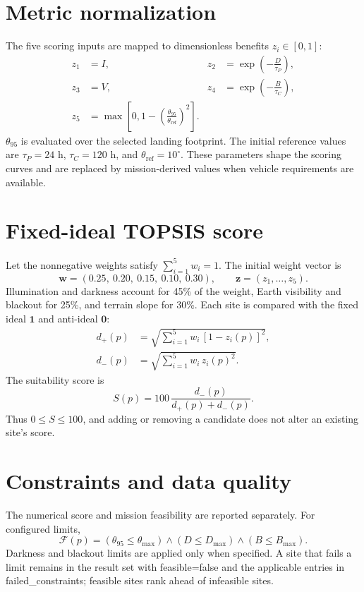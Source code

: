 \documentclass[10pt,a4paper]{article}
\newcommand{\code}[1]{{\ttfamily\small #1}}
\begin{document}
\section{Metric normalization}
The five scoring inputs are mapped to dimensionless benefits $z_i\in[0,1]$:
\begin{align}
z_1 &= I, & z_2 &= \exp\!\left(-\frac{D}{\tau_P}\right),\\
z_3 &= V, & z_4 &= \exp\!\left(-\frac{B}{\tau_C}\right),\\
z_5 &= \max\!\left[0,1-\left(\frac{\theta_{95}}{\theta_{\mathrm{ref}}}\right)^2\right].
\end{align}
$\theta_{95}$ is evaluated over the selected landing footprint. The initial reference values are $\tau_P=24$ h, $\tau_C=120$ h, and $\theta_{\mathrm{ref}}=10^\circ$. These parameters shape the scoring curves and are replaced by mission-derived values when vehicle requirements are available.

\section{Fixed-ideal TOPSIS score}
Let the nonnegative weights satisfy $\sum_{i=1}^{5}w_i=1$. The initial weight vector is
\begin{equation}
\boldsymbol{w}=(0.25,\ 0.20,\ 0.15,\ 0.10,\ 0.30),
\qquad
\boldsymbol{z}=(z_1,\ldots,z_5).
\end{equation}
Illumination and darkness account for 45\% of the weight, Earth visibility and blackout for 25\%, and terrain slope for 30\%. Each site is compared with the fixed ideal $\boldsymbol{1}$ and anti-ideal $\boldsymbol{0}$:
\begin{align}
d_+(p)&=\sqrt{\sum_{i=1}^{5}w_i\,[1-z_i(p)]^2},\\
d_-(p)&=\sqrt{\sum_{i=1}^{5}w_i\,z_i(p)^2}.
\end{align}
The suitability score is
\begin{equation}
\boxed{S(p)=100\,\frac{d_-(p)}{d_+(p)+d_-(p)}}.
\label{eq:score}
\end{equation}
Thus $0\leq S\leq100$, and adding or removing a candidate does not alter an existing site's score.

\newpage

\section{Constraints and data quality}
The numerical score and mission feasibility are reported separately. For configured limits,
\begin{equation}
\mathcal{F}(p)=
(\theta_{95}\leq\theta_{\max})\land
(D\leq D_{\max})\land
(B\leq B_{\max}).
\end{equation}
Darkness and blackout limits are applied only when specified. A site that fails a limit remains in the result set with \code{feasible=false} and the applicable entries in \code{failed\_constraints}; feasible sites rank ahead of infeasible sites.
\end{document}
